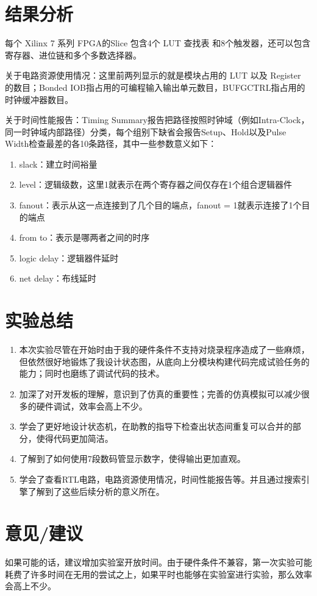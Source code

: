 \documentclass[a4paper]{article}
\begin{document}
\section {结果分析}
每个 Xilinx 7 系列 FPGA的Slice 包含4个 LUT 查找表 和8个触发器，还可以包含寄存器、进位链和多个多数选择器。

关于电路资源使用情况：这里前两列显示的就是模块占用的 LUT 以及 Register 的数目；Bonded IOB指占用的可编程输入输出单元数目，BUFGCTRL指占用的时钟缓冲器数目。

关于时间性能报告：Timing Summary报告把路径按照时钟域（例如Intra-Clock，同一时钟域内部路径）分类，每个组别下缺省会报告Setup、Hold以及Pulse Width检查最差的各10条路径，其中一些参数意义如下：
\begin{enumerate}
  \item slack：建立时间裕量
  \item level：逻辑级数，这里1就表示在两个寄存器之间仅存在1个组合逻辑器件
  \item fanout：表示从这一点连接到了几个目的端点，fanout = 1就表示连接了1个目的端点
  \item from to：表示是哪两者之间的时序
  \item logic delay：逻辑器件延时
  \item net delay：布线延时
\end{enumerate}
\section {实验总结}
\begin{enumerate}
  \item 本次实验尽管在开始时由于我的硬件条件不支持对烧录程序造成了一些麻烦，但依然很好地锻炼了我设计状态图，从底向上分模块构建代码完成试验任务的能力；同时也磨练了调试代码的技术。
  \item 加深了对开发板的理解，意识到了仿真的重要性；完善的仿真模拟可以减少很多的硬件调试，效率会高上不少。
  \item 学会了更好地设计状态机，在助教的指导下检查出状态间重复可以合并的部分，使得代码更加简洁。
  \item 了解到了如何使用7段数码管显示数字，使得输出更加直观。
  \item 学会了查看RTL电路，电路资源使用情况，时间性能报告等。并且通过搜索引擎了解到了这些后续分析的意义所在。
\end{enumerate}
\section {意见/建议}
如果可能的话，建议增加实验室开放时间。由于硬件条件不兼容，第一次实验可能耗费了许多时间在无用的尝试之上，如果平时也能够在实验室进行实验，那么效率会高上不少。
\end{document}
